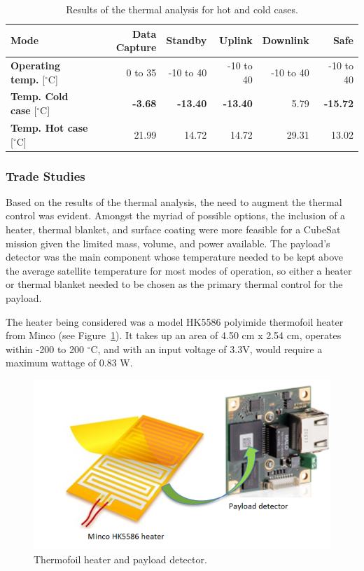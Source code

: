 \documentclass[12pt]{article}
\begin{document}
\begin{table}[ht]%
\caption{Results of the thermal analysis for hot and cold cases.}
\label{table:thermal-results}
\begin{tabular}{|l|r|r|r|r|r|}\hline
\textbf{Mode} & \textbf{Data Capture} & \textbf{Standby} & \textbf{Uplink} & \textbf{Downlink} & \textbf{Safe} \\\hline
\textbf{Operating temp.} [$^\circ$C] & 0 to 35 & -10 to 40 & -10 to 40 & -10 to 40 & -10 to 40 \\\hline
\textbf{Temp. Cold case} [$^\circ$C] & \textbf{-3.68} & \textbf{-13.40} & \textbf{-13.40} & 5.79 & \textbf{-15.72} \\\hline
\textbf{Temp. Hot case} [$^\circ$C] & 21.99 & 14.72 & 14.72 & 29.31 & 13.02 \\\hline
\end{tabular}
\end{table}

\subsubsection{Trade Studies}

Based on the results of the thermal analysis, the need to augment the thermal control was evident. Amongst the myriad of possible options, the inclusion of a heater, thermal blanket, and surface coating were more feasible for a CubeSat mission given the limited mass, volume, and power available. The payload’s detector was the main component whose temperature needed to be kept above the average satellite temperature for most modes of operation, so either a heater or thermal blanket needed to be chosen as the primary thermal control for the payload.

The heater being considered was a model HK5586 polyimide thermofoil heater from Minco (see Figure~\ref{fig:thermal-heater}). It takes up an area of 4.50 cm x 2.54 cm, operates within -200 to 200 $^\circ$C, and with an input voltage of 3.3V, would require a maximum wattage of 0.83 W. 

\begin{figure}[ht]%
\centering
\includegraphics{images/thermal-heater}%
\caption{Thermofoil heater and payload detector.\cite{minco,ids-imaging}}%
\label{fig:thermal-heater}%
\end{figure}
\end{document}
